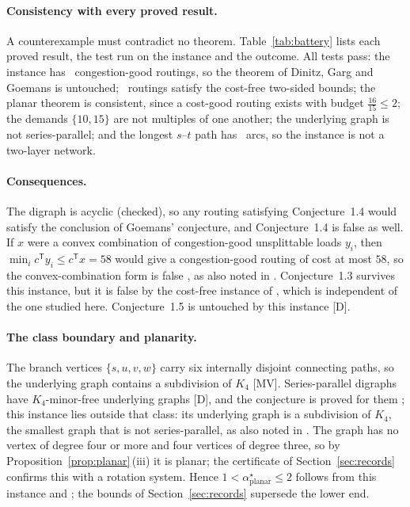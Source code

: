 \documentclass[11pt]{article}
\theoremstyle{remark}
\begin{document}
\paragraph{Consistency with every proved result.} A counterexample must contradict no theorem. Table~\ref{tab:battery} lists each proved result, the test run on the instance and the outcome. All tests pass: the instance has \ngood\ congestion-good routings, so the theorem of
Dinitz, Garg and Goemans is untouched; \ntwowitness\ routings satisfy the cost-free two-sided bounds; the planar theorem is consistent, since a cost-good routing exists with budget $\tfrac{16}{15}\le2$; the demands $\{10,15\}$ are not multiples of one another; the underlying graph is not series-parallel; and the longest $s$--$t$ path has \nmaxpathlen\ arcs, so
the instance is not a two-layer network.



\paragraph{Consequences.} The digraph is acyclic (checked), so any routing satisfying Conjecture~1.4 would satisfy the conclusion of Goemans' conjecture, and Conjecture~1.4 is false as well. If $x$ were a convex combination of congestion-good unsplittable loads $y_i$, then $\min_ic^{\mathsf T}y_i\le c^{\mathsf T}x=58$ would give a congestion-good routing of cost at most $58$, so the convex-combination form is false \cite{MSS07,MSW25}, as also noted in \cite{Muf26}. Conjecture~1.3
survives this instance, but it is false by the cost-free instance of \cite{BLRT26}, which is independent of the one studied here. Conjecture~1.5 is untouched by this instance [D].

\paragraph{The class boundary and planarity.} The branch vertices $\{s,u,v,w\}$ carry six internally disjoint connecting paths, so the underlying graph contains a subdivision of $K_4$ [MV]. Series-parallel digraphs have $K_4$-minor-free underlying graphs [D], and the conjecture is proved for them \cite{MSW25}; this instance lies outside that class: its underlying graph is a subdivision of $K_4$, the smallest graph that is not series-parallel, as also noted in \cite{Muf26}. The graph has no vertex of degree four or more and four vertices of degree three, so by
Proposition~\ref{prop:planar}\,(iii) it is planar; the certificate of Section~\ref{sec:records} confirms this with a rotation system. Hence $1<\alpha^\star_{\mathrm{planar}}\le2$ follows from this instance and \cite{TVZ24}; the bounds of Section~\ref{sec:records} supersede the lower end.
\end{document}
